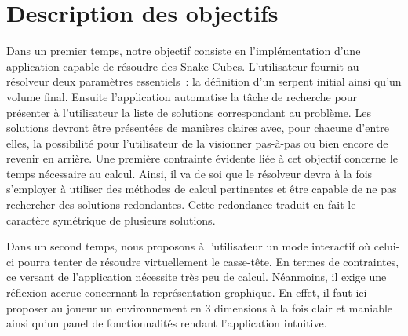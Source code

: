 \chapter{Description des objectifs} 
Dans un premier temps, notre objectif consiste en l’implémentation d’une application capable de résoudre des Snake Cubes. L’utilisateur fournit au résolveur deux paramètres essentiels : la définition d’un serpent initial ainsi qu’un volume final. Ensuite l’application automatise la tâche de recherche pour présenter à l’utilisateur la liste de solutions correspondant au problème. Les solutions devront être présentées de manières claires avec, pour chacune d’entre elles, la possibilité pour l’utilisateur de la visionner pas-à-pas ou bien encore de revenir en arrière. Une première contrainte évidente liée à cet objectif concerne le temps nécessaire au calcul. Ainsi, il va de soi que le résolveur devra à la fois s’employer à utiliser des méthodes de calcul pertinentes et être capable de ne pas rechercher des solutions redondantes. Cette redondance traduit en fait le caractère symétrique de plusieurs solutions. 

Dans un second temps, nous proposons à l’utilisateur un mode interactif où celui-ci pourra tenter de résoudre virtuellement le casse-tête. En termes de contraintes, ce versant de l’application nécessite très peu de calcul. Néanmoins, il exige une réflexion accrue concernant la représentation graphique. En effet, il faut ici proposer au joueur un environnement en 3 dimensions à la fois clair et maniable ainsi qu’un panel de fonctionnalités rendant l’application intuitive. 